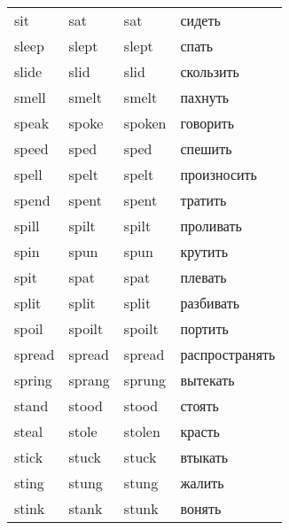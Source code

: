 \begin{longtable}{| m{} | m{} | m{} | m{} |}
    sit                & sat                 & sat                     & сидеть              \\
    sleep              & slept               & slept                   & спать               \\
    slide              & slid                & slid                    & скользить           \\
    smell              & smelt               & smelt                   & пахнуть             \\
    speak              & spoke               & spoken                  & говорить            \\
    speed              & sped                & sped                    & спешить             \\
    spell              & spelt               & spelt                   & произносить         \\
    spend              & spent               & spent                   & тратить             \\
    spill              & spilt               & spilt                   & проливать           \\
    spin               & spun                & spun                    & крутить             \\
    spit               & spat                & spat                    & плевать             \\
    split              & split               & split                   & разбивать           \\
    spoil              & spoilt              & spoilt                  & портить             \\
    spread             & spread              & spread                  & распространять      \\
    spring             & sprang              & sprung                  & вытекать            \\
    stand              & stood               & stood                   & стоять              \\
    steal              & stole               & stolen                  & красть              \\
    stick              & stuck               & stuck                   & втыкать             \\
    sting              & stung               & stung                   & жалить              \\
    stink              & stank               & stunk                   & вонять              \\

\end{longtable}
